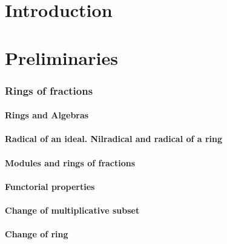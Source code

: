 
\part*{Introduction}


\clearpage

\setcounter{part}{-1}

\part{Preliminaries}
\label{0-prelim}

    \section{Rings of fractions}
    \label{0-prelim-1}
    \setcounter{subsection}{-1}

        \subsection{Rings and Algebras}
        \label{0-prelim-1.0}
        

        \subsection{Radical of an ideal. Nilradical and radical of a ring}
        \label{0-prelim-1.1}
        

        \subsection{Modules and rings of fractions}
        \label{0-prelim-1.2}
        

        \subsection{Functorial properties}
        \label{0-prelim-1.3}
        

        \subsection{Change of multiplicative subset}
        \label{0-prelim-1.4}
        

        \subsection{Change of ring}
        \label{0-prelim-1.5}
        

